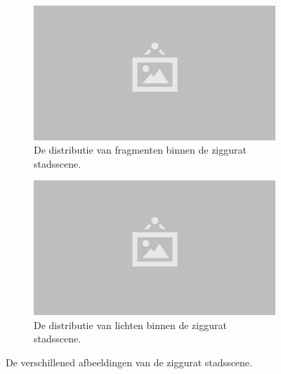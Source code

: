 \begin{figure}[p]
  \begin{subfigure}[b]{.33\linewidth}
    \centering\includegraphics[width=\textwidth]{./img/raw/placeholder.png}
    \caption{De distributie van fragmenten binnen de ziggurat stadsscene.}\label{fig:test-suite-ziggurat:fragments}
  \end{subfigure}%
  \begin{subfigure}[b]{.33\linewidth}
    \centering\includegraphics[width=\textwidth]{./img/raw/placeholder.png}
    \caption{De distributie van lichten binnen de ziggurat stadsscene.}\label{fig:test-suite-ziggurat:lights}
  \end{subfigure}%
  \caption{De verschillened afbeeldingen van de ziggurat stadsscene.}
  \label{fig:test-suite-ziggurat-images}
\end{figure}
